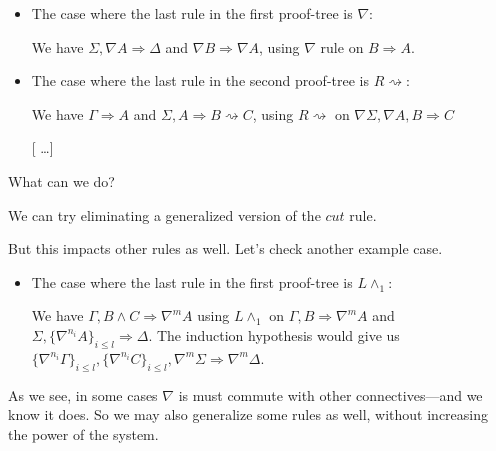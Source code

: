 \documentclass{beamer}
\begin{document}
\begin{frame}{\subAnalytic}
	\begin{block}{}
		\begin{itemize}
			\item The case where the last rule in the first proof-tree is $\nabla$:
			
			We have $\Sigma, \nabla A \Rightarrow \Delta$ and $\nabla B \Rightarrow \nabla A$, using $\nabla$ rule on $B \Rightarrow A$.
	
			\item The case where the last rule in the second proof-tree is $R \rightsquigarrow$:
			
			We have $\Gamma \Rightarrow A$ and $\Sigma, A \Rightarrow B \rightsquigarrow C$, using $R \rightsquigarrow$ on $\nabla \Sigma, \nabla A, B \Rightarrow C$

			[ \dots ]
		\end{itemize}

		\quad \small What can we do?
	\end{block}

	We can try eliminating a generalized version of the $cut$ rule.

	\begin{block}{}
		\begin{prooftree}
		\end{prooftree}
	\end{block}
\end{frame}

\begin{frame}{\subAnalytic}
	But this impacts other rules as well. Let's check another example case.
	\begin{block}{}
		\begin{itemize}
			\item The case where the last rule in the first proof-tree is $L \wedge_1$:
			
			We have $\Gamma, B \wedge C \Rightarrow \nabla^m A$ using $L \wedge_1$ on $\Gamma, B \Rightarrow \nabla^m A$ and $\Sigma , \{\nabla^{n_i} A\}_{i \leq l} \Rightarrow \Delta$. The induction hypothesis would give us $\{\nabla^{n_i} \Gamma\}_{i \leq l}, \{\nabla^{n_i} C \}_{i \leq l}, \nabla^m \Sigma \Rightarrow \nabla^m \Delta$.
		\end{itemize}
		\quad [ \dots ]
	\end{block}

	As we see, in some cases $\nabla$ is must commute with other connectives---and we know it does. So we may also generalize some rules as well, without increasing the power of the system.
\end{frame}
\end{document}
